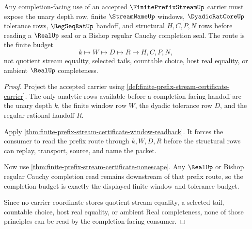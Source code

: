 \begin{theorem}
\label{thm:finite-prefix-stream-certificate-real-completion-budget-route}
Any completion-facing use of an accepted $\FinitePrefixStreamUp$ carrier must expose the unary depth row, finite $\StreamNameUp$ windows, $\DyadicRatCoreUp$ tolerance rows, $\RegSeqRatUp$ handoff, and structural $H,C,P,N$ rows before reading a $\RealUp$ seal or a Bishop regular Cauchy completion seal. The route is the finite budget
$$
k \longmapsto W \longmapsto D \longmapsto R \longmapsto H,C,P,N ,
$$
not quotient stream equality, selected tails, countable choice, host real equality, or ambient $\RealUp$ completeness.
\end{theorem}
\begin{proof}
Project the accepted carrier using \autoref{def:finite-prefix-stream-certificate-carrier}. The only analytic rows available before a completion-facing handoff are the unary depth $k$, the finite window row $W$, the dyadic tolerance row $D$, and the regular rational handoff $R$.

Apply \autoref{thm:finite-prefix-stream-certificate-window-readback}. It forces the consumer to read the prefix route through $k,W,D,R$ before the structural rows can replay, transport, source, and name the packet.

Now use \autoref{thm:finite-prefix-stream-certificate-nonescape}. Any $\RealUp$ or Bishop regular Cauchy completion read remains downstream of that prefix route, so the completion budget is exactly the displayed finite window and tolerance budget.

Since no carrier coordinate stores quotient stream equality, a selected tail, countable choice, host real equality, or ambient Real completeness, none of those principles can be read by the completion-facing consumer.
\end{proof}

